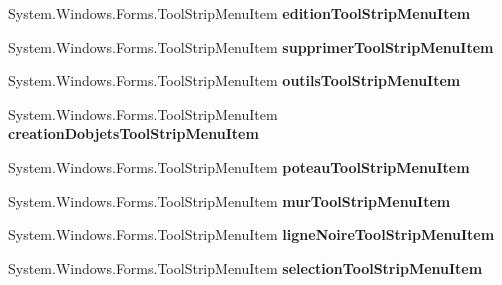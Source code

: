 \begin{DoxyCompactItemize}
\item 
System.\+Windows.\+Forms.\+Tool\+Strip\+Menu\+Item {\bfseries edition\+Tool\+Strip\+Menu\+Item}\hypertarget{class_interface_graphique_1_1_edition_ae71dbdd2888009b566e09f9697454fd4}{}\label{class_interface_graphique_1_1_edition_ae71dbdd2888009b566e09f9697454fd4}

\item 
System.\+Windows.\+Forms.\+Tool\+Strip\+Menu\+Item {\bfseries supprimer\+Tool\+Strip\+Menu\+Item}\hypertarget{class_interface_graphique_1_1_edition_a29f89ae4fb03e56ae50964c0b9024dab}{}\label{class_interface_graphique_1_1_edition_a29f89ae4fb03e56ae50964c0b9024dab}

\item 
System.\+Windows.\+Forms.\+Tool\+Strip\+Menu\+Item {\bfseries outils\+Tool\+Strip\+Menu\+Item}\hypertarget{class_interface_graphique_1_1_edition_a0f4938eefa049cc8203e2c36c4f44760}{}\label{class_interface_graphique_1_1_edition_a0f4938eefa049cc8203e2c36c4f44760}

\item 
System.\+Windows.\+Forms.\+Tool\+Strip\+Menu\+Item {\bfseries creation\+Dobjets\+Tool\+Strip\+Menu\+Item}\hypertarget{class_interface_graphique_1_1_edition_a35be5647781f06f310f89b9c70a3fcba}{}\label{class_interface_graphique_1_1_edition_a35be5647781f06f310f89b9c70a3fcba}

\item 
System.\+Windows.\+Forms.\+Tool\+Strip\+Menu\+Item {\bfseries poteau\+Tool\+Strip\+Menu\+Item}\hypertarget{class_interface_graphique_1_1_edition_a22118548a68230dd6b9577a9d38068ff}{}\label{class_interface_graphique_1_1_edition_a22118548a68230dd6b9577a9d38068ff}

\item 
System.\+Windows.\+Forms.\+Tool\+Strip\+Menu\+Item {\bfseries mur\+Tool\+Strip\+Menu\+Item}\hypertarget{class_interface_graphique_1_1_edition_a13f6473693f3b798aa7c6ea5eb981267}{}\label{class_interface_graphique_1_1_edition_a13f6473693f3b798aa7c6ea5eb981267}

\item 
System.\+Windows.\+Forms.\+Tool\+Strip\+Menu\+Item {\bfseries ligne\+Noire\+Tool\+Strip\+Menu\+Item}\hypertarget{class_interface_graphique_1_1_edition_a5599fd0835ac516997abf4c8c155fcf6}{}\label{class_interface_graphique_1_1_edition_a5599fd0835ac516997abf4c8c155fcf6}

\item 
System.\+Windows.\+Forms.\+Tool\+Strip\+Menu\+Item {\bfseries selection\+Tool\+Strip\+Menu\+Item}\hypertarget{class_interface_graphique_1_1_edition_ab667b4724b3f9b6a539acb9c5ed5e900}{}\label{class_interface_graphique_1_1_edition_ab667b4724b3f9b6a539acb9c5ed5e900}


\end{DoxyCompactItemize}

